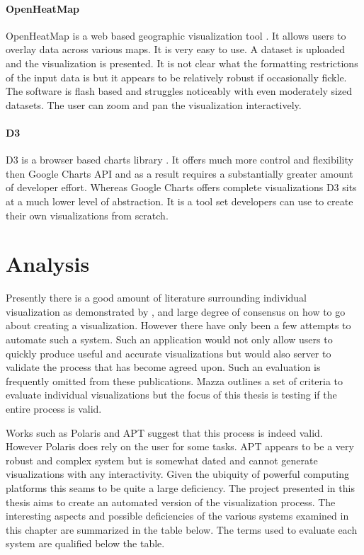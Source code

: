 \documentclass[a4paper, 11pt, titlepage, onehalfspacing]{report}
\begin{document}
\paragraph{OpenHeatMap}
OpenHeatMap is a web based geographic visualization tool \cite{openheatmap}. It allows users to overlay data across various maps. It is very easy to use. A dataset is uploaded and the visualization is presented. It is not clear what the formatting restrictions of the input data is but it appears to be relatively robust if occasionally fickle. The software is flash based and struggles noticeably with even moderately sized datasets. The user can zoom and pan the visualization interactively.
\paragraph{D3}
D3 is a browser based charts library \cite{d3}. It offers much more control and flexibility then Google Charts API and as a result requires a substantially greater amount of developer effort. Whereas Google Charts offers complete visualizations D3 sits at a much lower level of abstraction. It is a tool set developers can use to create their own visualizations from scratch. 


\section{Analysis}
Presently there is a good amount of literature surrounding individual visualization as demonstrated by \cite{mazza2009introduction}, and large degree of consensus on how to go about creating a visualization. However there have only been a few attempts to automate such a system. Such an application would not only allow users to quickly produce useful and accurate visualizations but would also server to validate the process that has become agreed upon. Such an evaluation is frequently omitted from these publications. Mazza outlines a set of criteria to evaluate individual visualizations but the focus of this thesis is testing if the entire process is valid. 

Works such as Polaris and APT suggest that this process is indeed valid. However Polaris does rely on the user for some tasks. APT appears to be a very robust and complex system but is somewhat dated and cannot generate visualizations with any interactivity. Given the ubiquity of powerful computing platforms this seams to be quite a large deficiency. The project presented in this thesis aims to create an automated version of the visualization process. The interesting aspects and possible deficiencies of the various systems examined in this chapter are summarized in the table below. The terms used to evaluate each system are qualified below the table.
\end{document}
